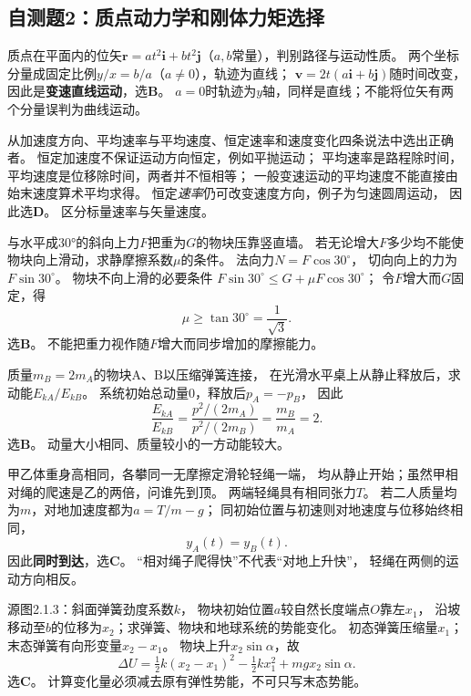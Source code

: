 \subsection{自测题2：质点动力学和刚体力矩选择}

\problemtext 质点在平面内的位矢$\bm r=at^2\bm i+bt^2\bm j$（$a,b$常量），判别路径与运动性质。
\workings
两个坐标分量成固定比例$y/x=b/a$（$a\ne0$），轨迹为直线；
$\bm v=2t(a\bm i+b\bm j)$随时间改变，因此是\textbf{变速直线运动}，选\textbf{B}。
\crosscheck $a=0$时轨迹为$y$轴，同样是直线；不能将位矢有两个分量误判为曲线运动。

\problemtext 从加速度方向、平均速率与平均速度、恒定速率和速度变化四条说法中选出正确者。
\workings
恒定加速度不保证运动方向恒定，例如平抛运动；
平均速率是路程除时间，平均速度是位移除时间，两者并不恒相等；
一般变速运动的平均速度不能直接由始末速度算术平均求得。
恒定\emph{速率}仍可改变速度方向，例子为匀速圆周运动，
因此选\textbf{D}。
\crosscheck 区分标量速率与矢量速度。

\problemtext 与水平成30°的斜向上力$F$把重为$G$的物块压靠竖直墙。
若无论增大$F$多少均不能使物块向上滑动，求静摩擦系数$\mu$的条件。
\workings
法向力$N=F\cos30^\circ$，
切向向上的力为$F\sin30^\circ$。
物块不向上滑的必要条件
$F\sin30^\circ\le G+\mu F\cos30^\circ$；
令$F$增大而$G$固定，得
\[
\boxed{\mu\ge\tan30^\circ=\frac1{\sqrt3}}.
\]
选\textbf{B}。
\crosscheck 不能把重力视作随$F$增大而同步增加的摩擦能力。

\problemtext 质量$m_B=2m_A$的物块A、B以压缩弹簧连接，
在光滑水平桌上从静止释放后，求动能$E_{kA}/E_{kB}$。
\workings
系统初始总动量0，释放后$p_A=-p_B$，
因此
\[
\boxed{\frac{E_{kA}}{E_{kB}}
=\frac{p^2/(2m_A)}{p^2/(2m_B)}
=\frac{m_B}{m_A}=2}.
\]
选\textbf{B}。
\crosscheck 动量大小相同、质量较小的一方动能较大。

\problemtext 甲乙体重身高相同，各攀同一无摩擦定滑轮轻绳一端，
均从静止开始；虽然甲相对绳的爬速是乙的两倍，问谁先到顶。
\workings
两端轻绳具有相同张力$T$。
若二人质量均为$m$，对地加速度都为$a=T/m-g$；
同初始位置与初速则对地速度与位移始终相同，
\[
\boxed{y_A(t)=y_B(t)}.
\]
因此\textbf{同时到达}，选\textbf{C}。
\crosscheck “相对绳子爬得快”不代表“对地上升快”，
轻绳在两侧的运动方向相反。

\problemtext 源图2.1.3：斜面弹簧劲度系数$k$，
物块初始位置$a$较自然长度端点$O$靠左$x_1$，
沿坡移动至$b$的位移为$x_2$；求弹簧、物块和地球系统的势能变化。
\workings
初态弹簧压缩量$x_1$；末态弹簧有向形变量$x_2-x_1$。
物块上升$x_2\sin\alpha$，故
\[
\boxed{\Delta U
=\tfrac12 k(x_2-x_1)^2-\tfrac12kx_1^2
+mgx_2\sin\alpha}.
\]
选\textbf{C}。
\crosscheck 计算变化量必须减去原有弹性势能，不可只写末态势能。

